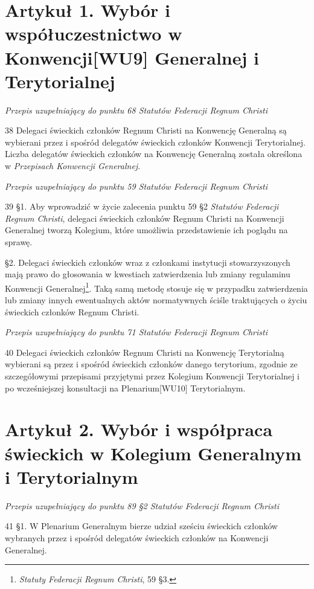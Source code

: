 ﻿\documentclass{report}
\newcommand{\lett}[1]{\lettrine[findent=6pt]{#1}{}}
\newcommand{\ssec}[1]{\vspace{1em}\textit{#1}\vspace{.5em}\nopagebreak}
\begin{document}
\section{Artykuł 1. Wybór i współuczestnictwo w Konwencji[WU9]  Generalnej i Terytorialnej}
 
\ssec{Przepis uzupełniający do punktu 68 {\em Statutów Federacji Regnum Christi}}
 
\lett{38} Delegaci świeckich członków Regnum Christi na Konwencję Generalną są wybierani przez i spośród delegatów świeckich członków Konwencji Terytorialnej. Liczba delegatów świeckich członków na Konwencję Generalną została określona w {\em Przepisach Konwencji Generalnej}.


\ssec{Przepis uzupełniający do punktu 59 {\em Statutów Federacji Regnum Christi}}


\lett{39} \S{}1. Aby wprowadzić w życie zalecenia punktu 59 \S{}2 {\em Statutów Federacji Regnum Christi}, delegaci świeckich członków Regnum Christi na Konwencji Generalnej tworzą Kolegium, które umożliwia przedstawienie ich poglądu na sprawę.


\S{}2. Delegaci świeckich członków wraz z członkami instytucji stowarzyszonych mają prawo do głosowania w kwestiach zatwierdzenia lub zmiany regulaminu Konwencji Generalnej\footnote{{\em Statuty Federacji Regnum Christi}, 59 \S{}3.}. Taką samą metodę stosuje się w przypadku zatwierdzenia lub zmiany innych ewentualnych aktów normatywnych ściśle traktujących o życiu świeckich członków Regnum Christi.


\ssec{Przepis uzupełniający do punktu 71 {\em Statutów Federacji Regnum Christi}}


\lett{40} Delegaci świeckich członków Regnum Christi na Konwencję Terytorialną wybierani są przez i spośród świeckich członków danego terytorium, zgodnie ze szczegółowymi przepisami przyjętymi przez Kolegium Konwencji Terytorialnej i po wcześniejszej konsultacji na Plenarium[WU10]  Terytorialnym.
 
\section{Artykuł 2. Wybór i współpraca świeckich w Kolegium Generalnym i Terytorialnym}


\ssec{Przepis uzupełniający do punktu 89 \S{}2 {\em Statutów Federacji Regnum Christi}}


\lett{41} \S{}1. W Plenarium Generalnym bierze udział sześciu świeckich członków wybranych przez i spośród delegatów świeckich członków na Konwencji Generalnej.
\end{document}
